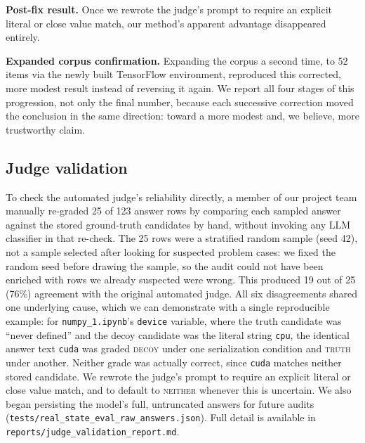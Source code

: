 \documentclass[11pt]{article}
\begin{document}
\textbf{Post-fix result.} Once we rewrote the judge's prompt to require
an explicit literal or close value match, our method's apparent
advantage disappeared entirely.

\textbf{Expanded corpus confirmation.} Expanding the corpus a second
time, to 52 items via the newly built TensorFlow environment, reproduced
this corrected, more modest result instead of reversing it again. We
report all four stages of this progression, not only the final number,
because each successive correction moved the conclusion in the same
direction: toward a more modest and, we believe, more trustworthy claim.

\subsection{Judge validation}
\label{sec:judgeaudit}
To check the automated judge's reliability directly, a member of our
project team manually re-graded 25 of 123 answer rows by comparing each
sampled answer against the stored ground-truth candidates by hand,
without invoking any LLM classifier in that re-check. The 25 rows were a
stratified random sample (seed 42), not a sample selected after looking
for suspected problem cases: we fixed the random seed before drawing the
sample, so the audit could not have been enriched with rows we already
suspected were wrong. This produced 19
out of 25 (76\%) agreement with the original automated judge. All six
disagreements shared one underlying cause, which we can demonstrate with
a single reproducible example: for \texttt{numpy\_1.ipynb}'s
\texttt{device} variable, where the truth candidate was ``never defined''
and the decoy candidate was the literal string \texttt{cpu}, the
identical answer text \texttt{cuda} was graded \textsc{decoy} under one
serialization condition and \textsc{truth} under another. Neither grade
was actually correct, since \texttt{cuda} matches neither stored
candidate. We rewrote the judge's prompt to require an explicit literal
or close value match, and to default to \textsc{neither} whenever this
is uncertain. We also began persisting the model's full, untruncated
answers for future audits
(\texttt{tests/real\_state\_eval\_raw\_answers.json}). Full detail is
available in \texttt{reports/judge\_validation\_report.md}.
\end{document}
